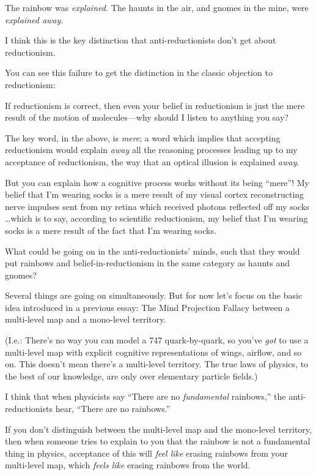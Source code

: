 {
 The rainbow was \textit{explained.} The haunts in the air, and
gnomes in the mine, were \textit{explained away.}}

{
 I think this is the key distinction that anti-reductionists
don't get about reductionism.}

{
 You can see this failure to get the distinction in the classic
objection to reductionism:}

{
 If reductionism is correct, then even your belief in reductionism
is just the mere result of the motion of molecules---why should I
listen to anything you say?}

{
 The key word, in the above, is \textit{mere}; a word which implies
that accepting reductionism would explain \textit{away} all the
reasoning processes leading up to my acceptance of reductionism, the
way that an optical illusion is explained \textit{away}.}

{
 But you can explain how a cognitive process works without its
being ``mere''! My belief that
I'm wearing socks is a mere result of my visual cortex
reconstructing nerve impulses sent from my retina which received
photons reflected off my socks \ldots which is to say, according to
scientific reductionism, my belief that I'm wearing
socks is a mere result of the fact that I'm wearing
socks.}

{
 What could be going on in the anti-reductionists'
minds, such that they would put rainbows and belief-in-reductionism in
the same category as haunts and gnomes?}

{
 Several things are going on simultaneously. But for now
let's focus on the basic idea introduced in a previous
essay: The Mind Projection Fallacy between a multi-level map and a
mono-level territory.}

{
 (I.e.: There's no way you can model a 747
quark-by-quark, so you've \textit{got} to use a
multi-level map with explicit cognitive representations of wings,
airflow, and so on. This doesn't mean
there's a multi-level territory. The true laws of
physics, to the best of our knowledge, are only over elementary
particle fields.)}

{
 I think that when physicists say ``There are no
\textit{fundamental} rainbows,'' the
anti-reductionists hear, ``There are no
rainbows.''}

{
 If you don't distinguish between the multi-level
map and the mono-level territory, then when someone tries to explain to
you that the rainbow is not a fundamental thing in physics, acceptance
of this will \textit{feel like} erasing rainbows from your multi-level
map, which \textit{feels like} erasing rainbows from the world.}

